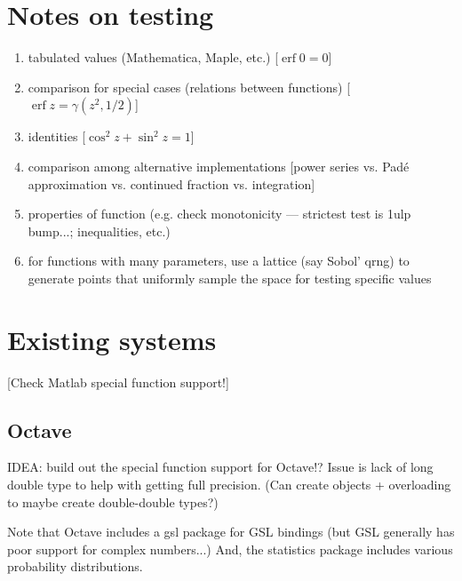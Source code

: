 \documentclass[10pt,dvipdfmx,letterpaper,twoside]{article}
\DeclareMathOperator{\erf}{erf}
\begin{document}
\section{Notes on testing}
\begin{enumerate}
\item tabulated values (Mathematica, Maple, etc.) [$\erf 0=0$]
\item comparison for special cases (relations between functions) [$\erf z=\gamma(z^2,1/2)$]
\item identities [$\cos^2z+\sin^2z=1$]
\item comparison among alternative implementations [power series vs. Pad\'e approximation vs. continued fraction vs. integration]
\item properties of function (e.g. check monotonicity --- strictest test is 1ulp bump...; inequalities, etc.)
\item for functions with many parameters, use a lattice (say Sobol' qrng) to generate points that uniformly sample the
  space for testing specific values
\end{enumerate}

\section{Existing systems}

[Check Matlab special function support!]

\subsection{Octave}

IDEA: build out the special function support for Octave!?  Issue is lack of
long double type to help with getting full precision.
(Can create objects + overloading to maybe create double-double types?)

Note that Octave includes a gsl package for GSL bindings (but GSL generally has poor support for complex numbers...)
And, the statistics package includes various probability distributions.
\end{document}
